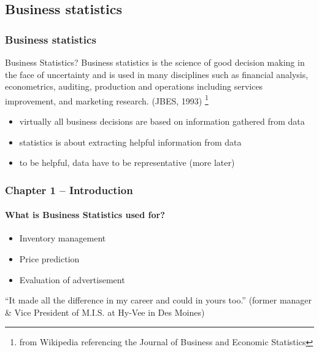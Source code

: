 \documentclass[handout]{beamer}
\begin{document}
\subsection{Business statistics}
\begin{frame}
\frametitle{Business statistics}

\pause

\begin{definition}{Business Statistics?}
Business statistics is the science of good decision making in the face of 
uncertainty and is used in many disciplines such as financial analysis, 
econometrics, auditing, production and operations including services 
improvement, and marketing research. 
(JBES, 1993)
\footnote{from Wikipedia referencing the Journal of Business and Economic Statistics}
\end{definition}

\vspace{0.1in} \pause

\begin{itemize}[<+->]
\item virtually all business decisions are based on information gathered from data
\item statistics is about extracting helpful information from data
\item to be helpful, data have to be representative (more later)
\end{itemize}
\end{frame}




\begin{frame}
\frametitle{Chapter 1 -- Introduction}
\framesubtitle{What is Business Statistics used for?}

\pause

\begin{itemize}[<+->]
\item Inventory management
\item Price prediction
\item Evaluation of advertisement
\end{itemize}

\vspace{0.1in} \pause


``It made all the difference in my career and could in yours too.'' 
(former manager \& Vice President of M.I.S. at Hy-Vee in Des Moines)

\end{frame}
\end{document}
